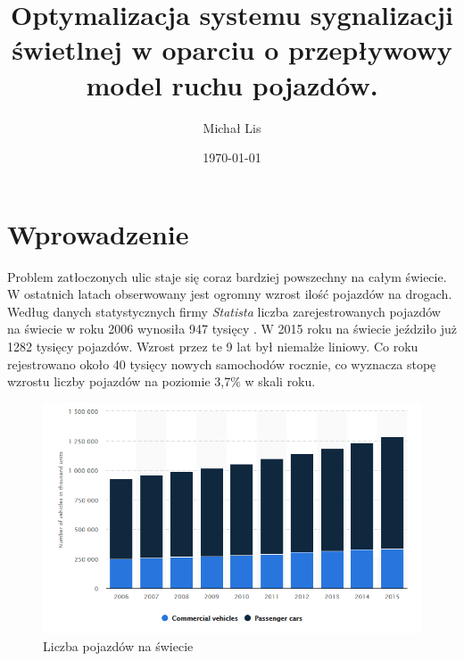 \documentclass[12pt]{book}
\theoremstyle{plain}
\begin{document}
\title{Optymalizacja  systemu sygnalizacji świetlnej w 
oparciu o przepływowy model ruchu pojazdów.}
\author{Michał Lis}
\date{\today}
\maketitle
\tableofcontents
\chapter{Wprowadzenie}
Problem zatłoczonych ulic staje się coraz bardziej powszechny na całym świecie. W ostatnich latach obserwowany jest ogromny wzrost ilość pojazdów na drogach.
Według danych statystycznych firmy \textit{Statista} liczba zarejestrowanych pojazdów na świecie w roku 2006 wynosiła 947 tysięcy \cite{liczbaPojazdowSwiat}. W 2015 roku na świecie jeździło już 1282 tysięcy pojazdów. Wzrost przez te 9 lat był niemalże liniowy. Co roku rejestrowano około 40 tysięcy nowych samochodów rocznie, co wyznacza stopę wzrostu liczby pojazdów na poziomie 3,7$\%$ w skali roku.
\begin{figure}[H]
  \centering
    \includegraphics[width=14cm]{liczbaPojazdowSwiat}
 \caption{Liczba pojazdów na świecie}
 \label{fig:liczbaPojazdowSwiat}
\end{figure} \noindent
\end{document}
